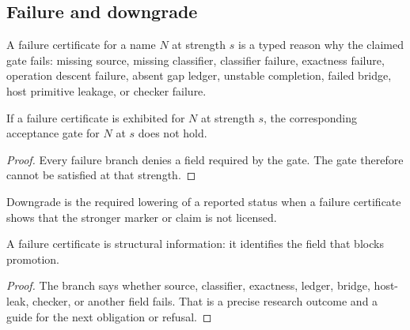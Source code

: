\subsection{Failure and downgrade}
\label{subsec:philosophy-programme-failure-downgrade}

\begin{definition}
\label{def:philosophy-programme-failure-cert-strength}
A failure certificate for a name \(N\) at strength \(s\) is a typed
reason why the claimed gate fails: missing source, missing classifier,
classifier failure, exactness failure, operation descent failure,
absent gap ledger, unstable completion, failed bridge, host primitive
leakage, or checker failure.
\end{definition}

\begin{theorem}
\label{thm:philosophy-programme-failure-blocks-gate}
If a failure certificate is exhibited for \(N\) at strength \(s\), the
corresponding acceptance gate for \(N\) at \(s\) does not hold.
\end{theorem}
\begin{proof}
Every failure branch denies a field required by the gate. The gate
therefore cannot be satisfied at that strength.
\end{proof}

\begin{definition}[Downgrade]
\label{def:philosophy-programme-downgrade}
Downgrade is the required lowering of a reported status when a failure
certificate shows that the stronger marker or claim is not licensed.
\end{definition}

\begin{corollary}
\label{cor:philosophy-programme-failure-is-result}
A failure certificate is structural information: it identifies the
field that blocks promotion.
\end{corollary}
\begin{proof}
The branch says whether source, classifier, exactness, ledger, bridge,
host-leak, checker, or another field fails. That is a precise research
outcome and a guide for the next obligation or refusal.
\end{proof}


